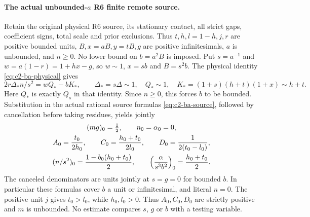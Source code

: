\paragraph{The actual unbounded-$a$ R6 finite remote source.}
Retain the original physical R6 source, its stationary contact, all
strict gaps, coefficient signs, total scale and prior exclusions.
Thus $t,h,l=1-h,j,r$ are positive bounded units,
$B,x=aB,y=tB,g$ are positive infinitesimals, $a$ is unbounded,
and $n\ge0$. No lower bound on $b=a^2B$ is imposed. Put
$s=a^{-1}$ and $w=a(1-r)=1+hx-g$, so $w\sim1$,
$x=sb$ and $B=s^2b$. The physical identity
\eqref{eq:c2-ba-physical} gives
\[
 2r\Delta_*n/s^2=wQ_*-bK_*,\qquad
 \Delta_*=s\Delta\sim1,\quad Q_*\sim1,\quad
 K_*=(1+s)(h+t)(1+x)\sim h+t.
\]
Here $Q_*$ is exactly $Q_s$ in that identity. Since $n\ge0$, this
forces $b$ to be bounded. Substitution in the actual rational source
formulas \eqref{eq:c2-ba-source}, followed by cancellation before
taking residues, yields jointly
\begin{equation}
 \begin{gathered}
 (mg)_0=\tfrac12,\qquad n_0=\alpha_0=0,\\
 A_0={t_0\over2h_0},\qquad
 C_0={h_0+t_0\over2l_0},\qquad
 D_0={1\over2(t_0-l_0)},\\
 (n/s^2)_0={1-b_0(h_0+t_0)\over2},\qquad
 \left({\alpha\over s^3b^2}\right)_0={h_0+t_0\over2}.
 \label{eq:c2-r55-r6-source}
 \end{gathered}
\end{equation}
The canceled denominators are units jointly at $s=g=0$ for bounded
$b$. In particular these formulas cover $b$ a unit or infinitesimal,
and literal $n=0$. The positive unit $j$ gives $t_0>l_0$, while
$h_0,l_0>0$. Thus $A_0,C_0,D_0$ are strictly positive and $m$ is
unbounded. No estimate compares $s$, $g$ or $b$ with a testing variable.

